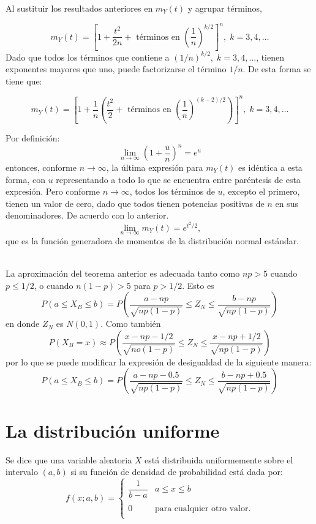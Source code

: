 \begin{teo}
	Al sustituir los resultados anteriores en $m_Y(t)$ y agrupar términos,

	$$m_Y(t)=\left[1+\dfrac{t^2}{2n}+\mbox{ términos en }\left(\dfrac{1}{n}\right)^{k/2}\right]^n,\; k=3,4,\ldots$$
	Dado que todos los términos que contiene a $(1/n)^{k/2},\; k=3,4,\ldots$, tienen exponentes mayores que uno, puede factorizarse el término $1/n$. De esta forma se tiene que:

	$$m_Y(t)=\left[1+\dfrac{1}{n} \left(\dfrac{t^2}{2}+\mbox{ términos en }\left(\dfrac{1}{n}\right)^{(k-2)/2}\right)\right]^n,\; k=3,4,\ldots$$

	Por definición:
	$$\lim_{n\to \infty}\left(1+\dfrac{u}{n}\right)^n=e^u$$
	entonces, conforme $n\to \infty$, la última expresión para $m_Y(t)$ es idéntica a esta forma, con $u$ representando a todo lo que se encuentra entre paréntesis de esta expresión. Pero conforme $n\to \infty$, todos los términos de $u$, excepto el primero, tienen un valor de cero, dado que todos tienen potencias positivas de $n$ en sus denominadores. De acuerdo con lo anterior.
	$$\lim_{n\to \infty}m_Y(t)=e^{t^2/2},$$
	que es la función generadora de momentos de la distribución normal estándar.\\\\

\end{teo}

La aproximación del teorema anterior es adecuada tanto como $np>5$ cuando $p\leq 1/2$, o cuando $n(1-p)>5$ para $p>1/2$. Esto es
$$P(a\leq X_B \leq b) = P\left(\dfrac{a-np}{\sqrt{np(1-p)}}\leq Z_N\leq \dfrac{b-np}{\sqrt{np(1-p)}}\right)$$
en donde $Z_N$ es $N(0,1)$. Como también
$$P(X_B=x)\approx P\left(\dfrac{x-np-1/2}{\sqrt{no(1-p)}}\leq Z_N\leq \dfrac{x-np+1/2}{\sqrt{np(1-p)}}\right)$$
por lo que se puede modificar la expresión de desigualdad de la siguiente manera:
$$P(a\leq X_B \leq b) = P\left(\dfrac{a-np-0.5}{\sqrt{np(1-p)}}\leq Z_N\leq \dfrac{b-np+0.5}{\sqrt{np(1-p)}}\right)$$


\section{La distribución uniforme}

\begin{tcolorbox}
    \begin{def.}
	Se dice que una variable aleatoria $X$ está distribuida uniformemente sobre el intervalo $(a,b)$ si su función de densidad de probabilidad está dada por:
	$$f(x;a,b) = \left\{ \begin{array}{ll}
		\dfrac{1}{b-a} & a\leq x\leq b \\\\
		0 & \mbox{para cualquier otro valor.} \\
	\end{array} \right.$$
    \end{def.}
\end{tcolorbox}

